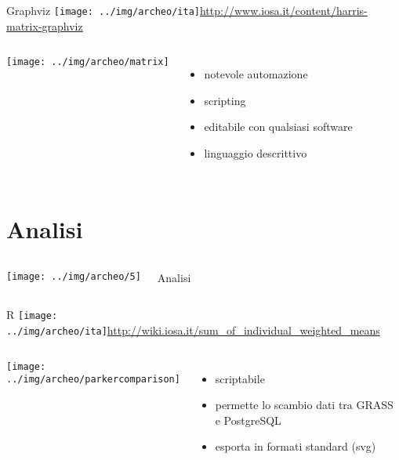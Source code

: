 \documentclass[xcolor=svgnames]{beamer}
\begin{document}

		\begin{frame}{Graphviz\hfill
			\texttt{[image: ../img/archeo/ita]}}{\url{http://www.iosa.it/content/harris-matrix-graphviz}}
			\begin{columns}[c]
					\begin{center}
						\texttt{[image: ../img/archeo/matrix]}
					\end{center}
					\begin{itemize}
						\item notevole automazione
						\item scripting
						\item editabile con qualsiasi software
						\item linguaggio descrittivo
					\end{itemize}
			\end{columns}
		\end{frame}

	\section{Analisi}

		\begin{frame}
			\begin{columns}[c]
					\begin{center}
						\texttt{[image: ../img/archeo/5]}
					\end{center}
					\Huge Analisi
			\end{columns}
		\end{frame}


		\begin{frame}{R\hfill
			\texttt{[image: ../img/archeo/ita]}}{\url{http://wiki.iosa.it/sum_of_individual_weighted_means}}
			\begin{columns}[c]
				\column{.5\textwidth}
					\begin{center}
						\texttt{[image: ../img/archeo/parkercomparison]}
					\end{center}
				\column{.5\textwidth}
					\begin{itemize}
						\item scriptabile
						\item permette lo scambio dati tra GRASS e PostgreSQL
						\item esporta in formati standard (svg)
					\end{itemize}
			\end{columns}
		\end{frame}
\end{document}
